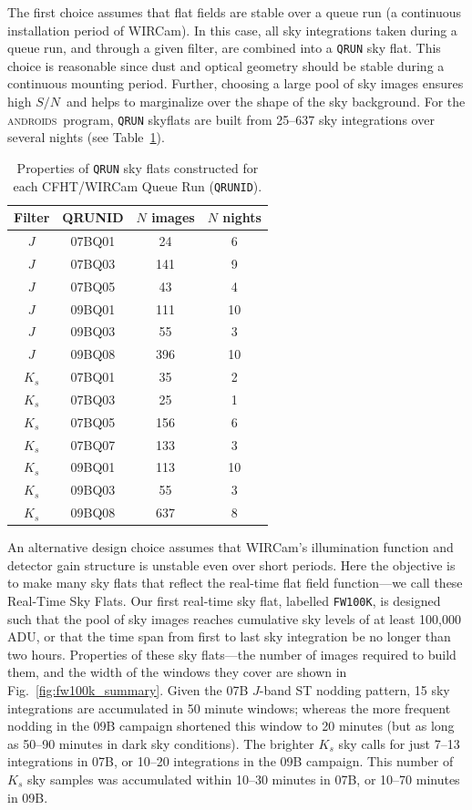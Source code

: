 \documentclass[iop]{emulateapj}
\newcommand{\sn}{\ensuremath{S/N}} %
\newcommand{\androids}{\textsc{androids}}
\newcommand{\Fig}[1]{Fig.~\ref{fig:#1}}  %
\newcommand{\Tab}[1]{Table~\ref{tab:#1}}  %
\begin{document}
The first choice assumes that flat fields are stable over a queue run (a continuous installation period of WIRCam).
In this case, all sky integrations taken during a queue run, and through a given filter, are combined into a \texttt{QRUN} sky flat.
This choice is reasonable since dust and optical geometry should be stable during a continuous mounting period.
Further, choosing a large pool of sky images ensures high \sn\, and helps to marginalize over the shape of the sky background.
For the \androids\ program, \texttt{QRUN} skyflats are built from 25--637 sky integrations over several nights (see \Tab{qrunflattable}).

\begin{table}[t]
\centering
\caption{Properties of \texttt{QRUN} sky flats constructed for each CFHT/WIRCam Queue Run (\texttt{QRUNID}).}
\label{tab:qrunflattable}

\begin{tabular}{cccc}
\hline
Filter & QRUNID & $N$ images & $N$ nights \\
\hline
$J$ & 07BQ01 & 24 & 6 \\
$J$ & 07BQ03 & 141 & 9 \\
$J$ & 07BQ05 & 43 & 4 \\
$J$ & 09BQ01 & 111 & 10 \\
$J$ & 09BQ03 & 55 & 3 \\
$J$ & 09BQ08 & 396 & 10 \\
\hline
$K_s$ & 07BQ01 & 35 & 2 \\
$K_s$ & 07BQ03 & 25 & 1 \\
$K_s$ & 07BQ05 & 156 & 6 \\
$K_s$ & 07BQ07 & 133 & 3 \\
$K_s$ & 09BQ01 & 113 & 10 \\
$K_s$ & 09BQ03 & 55 & 3 \\
$K_s$ & 09BQ08 & 637 & 8 \\
\hline
\end{tabular}
\end{table}

An alternative design choice assumes that WIRCam's illumination function and detector gain structure is unstable even over short periods.
Here the objective is to make many sky flats that reflect the real-time flat field function---we call these Real-Time Sky Flats.
Our first real-time sky flat, labelled \texttt{FW100K}, is designed such that the pool of sky images reaches cumulative sky levels of at least 100,000 ADU, or that the time span from first to last sky integration be no longer than two hours.
Properties of these sky flats---the number of images required to build them, and the width of the windows they cover are shown in \Fig{fw100k_summary}.
Given the 07B $J$-band ST nodding pattern, 15 sky integrations are accumulated in 50 minute windows; whereas the more frequent nodding in the 09B campaign shortened this window to 20 minutes (but as long as 50--90 minutes in dark sky conditions).
The brighter $K_s$ sky calls for just 7--13 integrations in 07B, or 10--20 integrations in the 09B campaign.
This number of $K_s$ sky samples was accumulated within 10--30 minutes in 07B, or 10--70 minutes in 09B.
\end{document}

